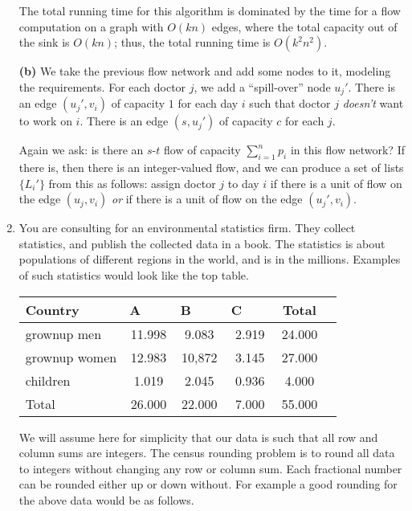 \documentclass[12pt]{article}
\begin{document}
\begin{enumerate}
{The total running time for this algorithm is dominated
by the time for a flow computation on a graph with $O(kn)$ edges,
where the total capacity out of the sink is $O(kn)$;
thus, the total running time is $O(k^2 n^2)$.

{\bf (b)} We take the previous flow network and
add some nodes to it, modeling the requirements.
For each doctor $j$, we add a ``spill-over'' node $u_j'$.
There is an edge $(u_j', v_i)$ of capacity $1$
for each day $i$ such that doctor $j$ {\em doesn't}
want to work on $i$.
There is an edge $(s,u_j')$ of capacity $c$ for each $j$.

Again we ask: is there an $s$-$t$ flow of capacity $\sum_{i=1}^n p_i$
in this flow network? 
If there is, then there is an integer-valued flow,
and we can produce a set of lists $\{L_i'\}$ from this
as follows: assign doctor $j$ to day $i$ if there
is a unit of flow on the edge $(u_j,v_i)$ 
{\em or} if there is a unit of flow on the edge $(u_j',v_i)$.

}


\item 

You are consulting for an environmental statistics firm. They
collect statistics, and publish the collected data in a book. The statistics
is about populations of different regions in the world, and is in the millions.
Examples of such statistics would look like the top table.

\begin{table}[h]
\begin{center}
\begin{tabular}{|l||c|c|c|c||c|}
\hline Country & A ~~~ & B ~~~  & C ~~~ & Total \\  \hline
grownup men  &  11.998 & 9.083 & 2.919& 24.000\\
grownup women &  12.983 & 10,872 & 3.145 & 27.000  \\  \hline
children &  1.019 &   2.045& 0.936& 4.000  \\ \hline \hline
Total &  26.000 & 22.000 & 7.000 & 55.000  \\ \hline
\end{tabular}
\end{center}
\end{table}

We will assume here for simplicity that our data is such that all
row and column sums are integers. The census rounding problem is to
round all data to integers without changing any row or column sum.
Each fractional number can be rounded either up or down without.
For example a good rounding for the above data would be as follows.


\end{enumerate}
\end{document}
